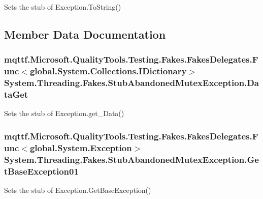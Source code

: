 Sets the stub of Exception.\-To\-String()



\subsection{Member Data Documentation}
\hypertarget{class_system_1_1_threading_1_1_fakes_1_1_stub_abandoned_mutex_exception_a2d34cef45fa20cc53735106df3f1b388}{
\subsubsection[{Data\-Get}]{\setlength{\rightskip}{0pt plus 5cm}mqttf.\-Microsoft.\-Quality\-Tools.\-Testing.\-Fakes.\-Fakes\-Delegates.\-Func$<$global.\-System.\-Collections.\-I\-Dictionary$>$ System.\-Threading.\-Fakes.\-Stub\-Abandoned\-Mutex\-Exception.\-Data\-Get}}\label{class_system_1_1_threading_1_1_fakes_1_1_stub_abandoned_mutex_exception_a2d34cef45fa20cc53735106df3f1b388}


Sets the stub of Exception.\-get\-\_\-\-Data()

\hypertarget{class_system_1_1_threading_1_1_fakes_1_1_stub_abandoned_mutex_exception_a3a59506732ebba673b758e2714018b0f}{
\subsubsection[{Get\-Base\-Exception01}]{\setlength{\rightskip}{0pt plus 5cm}mqttf.\-Microsoft.\-Quality\-Tools.\-Testing.\-Fakes.\-Fakes\-Delegates.\-Func$<$global.\-System.\-Exception$>$ System.\-Threading.\-Fakes.\-Stub\-Abandoned\-Mutex\-Exception.\-Get\-Base\-Exception01}}\label{class_system_1_1_threading_1_1_fakes_1_1_stub_abandoned_mutex_exception_a3a59506732ebba673b758e2714018b0f}


Sets the stub of Exception.\-Get\-Base\-Exception()

